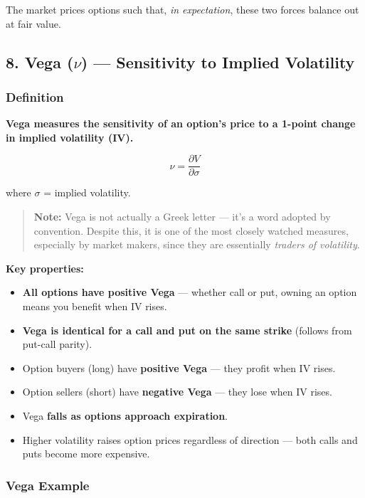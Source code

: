 \documentclass[12pt,openany]{book}
\begin{document}
The market prices options such that, \emph{in expectation}, these two forces balance out at fair value.

\subsection{8. Vega (\texorpdfstring{\(\nu\)}{nu}) — Sensitivity to Implied Volatility}

\subsubsection{Definition}

\textbf{Vega measures the sensitivity of an option's price to a 1-point change in implied volatility (IV).}

\[
\nu = \frac{\partial V}{\partial \sigma}
\]

where \(\sigma\) = implied volatility.

\begin{quote}
\textbf{Note:} Vega is not actually a Greek letter — it's a word adopted by convention. Despite this, it is one of the most closely watched measures, especially by market makers, since they are essentially \emph{traders of volatility}.
\end{quote}

\textbf{Key properties:}
\begin{itemize}[leftmargin=*]
    \item \textbf{All options have positive Vega} — whether call or put, owning an option means you benefit when IV rises.
    \item \textbf{Vega is identical for a call and put on the same strike} (follows from put-call parity).
    \item Option buyers (long) have \textbf{positive Vega} — they profit when IV rises.
    \item Option sellers (short) have \textbf{negative Vega} — they lose when IV rises.
    \item Vega \textbf{falls as options approach expiration}.
    \item Higher volatility raises option prices regardless of direction — both calls and puts become more expensive.
\end{itemize}

\subsubsection{Vega Example}
\end{document}
